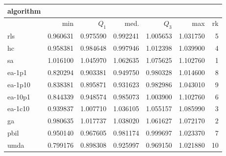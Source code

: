 \begin{tabular}{@{}l*{5}{>{{}}N{1}{2}}>{{}}N{2}{0}@{}}
\toprule
{algorithm} &  \\
\midrule
& {min} & {$Q_1$} & {med.} & {$Q_3$} & {max} & {rk}\\
\midrule
rls & 0.960631 & 0.975590 & 0.992241 & 1.005653 & 1.031750 & 5\\
hc & 0.958381 & 0.984648 & 0.997946 & 1.012398 & 1.039900 & 4\\
sa & {\color{blue}} 1.016100 & {\color{blue}} 1.045970 & {\color{blue}} 1.062635 & {\color{blue}} 1.075625 & {\color{blue}} 1.102760 & 1\\
ea-1p1 & 0.820294 & 0.903381 & 0.949750 & 0.980328 & 1.014600 & 8\\
ea-1p10 & 0.838381 & 0.895871 & 0.931623 & 0.982986 & 1.043010 & 9\\
ea-10p1 & 0.844339 & 0.948574 & 0.985073 & 1.003900 & {\color{blue}} 1.102760 & 6\\
ea-1c10 & 0.939837 & 1.007710 & 1.036105 & 1.055157 & 1.085990 & 3\\
ga & 0.980635 & 1.017737 & 1.038020 & 1.061627 & 1.072170 & 2\\
pbil & 0.950140 & 0.967605 & 0.981174 & 0.999697 & 1.023370 & 7\\
umda & 0.799176 & 0.898308 & 0.925997 & 0.969150 & 1.021880 & 10\\
\bottomrule
\end{tabular}
